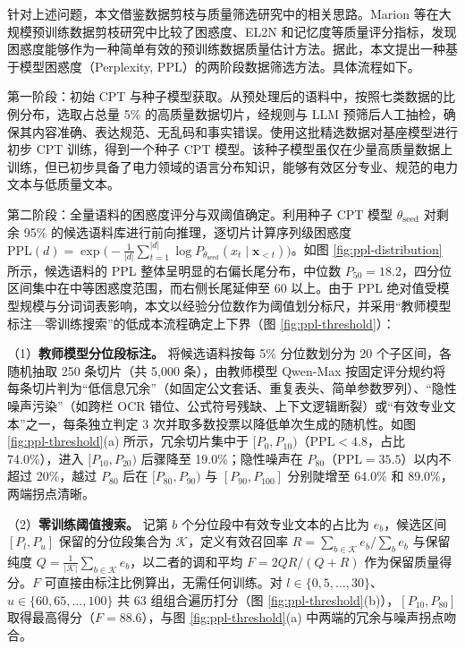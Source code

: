 \documentclass[fontset=fandol,type=master,campus=shenzhen,etitleauto=true]{hithesisbook}
\begin{document}
针对上述问题，本文借鉴数据剪枝与质量筛选研究中的相关思路。Marion 等在大规模预训练数据剪枝研究中比较了困惑度、EL2N 和记忆度等质量评分指标，发现困惑度能够作为一种简单有效的预训练数据质量估计方法\cite{ref58}。据此，本文提出一种基于模型困惑度（Perplexity, PPL）的两阶段数据筛选方法。具体流程如下。

第一阶段：初始 CPT 与种子模型获取。从预处理后的语料中，按照七类数据的比例分布，选取占总量 5\% 的高质量数据切片，经规则与 LLM 预筛后人工抽检，确保其内容准确、表达规范、无乱码和事实错误。使用这批精选数据对基座模型进行初步 CPT 训练，得到一个种子 CPT 模型。该种子模型虽仅在少量高质量数据上训练，但已初步具备了电力领域的语言分布知识，能够有效区分专业、规范的电力文本与低质量文本。

第二阶段：全量语料的困惑度评分与双阈值确定。利用种子 CPT 模型 $\theta_{\text{seed}}$ 对剩余 95\% 的候选语料库进行前向推理，逐切片计算序列级困惑度 $\text{PPL}(d) = \exp\bigl(-\frac{1}{|d|}\sum_{t=1}^{|d|} \log P_{\theta_{\text{seed}}}(x_t \mid \mathbf{x}_{<t})\bigr)$。如图 \ref{fig:ppl-distribution} 所示，候选语料的 PPL 整体呈明显的右偏长尾分布，中位数 $P_{50} = 18.2$，四分位区间集中在中等困惑度范围，而右侧长尾延伸至 $60$ 以上。由于 PPL 绝对值受模型规模与分词词表影响，本文以经验分位数作为阈值划分标尺，并采用“教师模型标注—零训练搜索”的低成本流程确定上下界（图 \ref{fig:ppl-threshold}）：

（1）\textbf{教师模型分位段标注。} 将候选语料按每 5\% 分位数划分为 20 个子区间，各随机抽取 250 条切片（共 5,000 条），由教师模型 Qwen-Max 按固定评分规约将每条切片判为“低信息冗余”（如固定公文套话、重复表头、简单参数罗列）、“隐性噪声污染”（如跨栏 OCR 错位、公式符号残缺、上下文逻辑断裂）或“有效专业文本”之一，每条独立判定 3 次并取多数投票以降低单次生成的随机性。如图 \ref{fig:ppl-threshold}(a) 所示，冗余切片集中于 $[P_0, P_{10})$（$\text{PPL} < 4.8$，占比 74.0\%），进入 $[P_{10}, P_{20})$ 后骤降至 19.0\%；隐性噪声在 $P_{80}$（$\text{PPL} = 35.5$）以内不超过 20\%，越过 $P_{80}$ 后在 $[P_{80}, P_{90})$ 与 $[P_{90}, P_{100}]$ 分别陡增至 64.0\% 和 89.0\%，两端拐点清晰。

（2）\textbf{零训练阈值搜索。} 记第 $b$ 个分位段中有效专业文本的占比为 $e_b$，候选区间 $[P_l, P_u]$ 保留的分位段集合为 $\mathcal{K}$，定义有效召回率 $R = \sum_{b \in \mathcal{K}} e_b / \sum_{b} e_b$ 与保留纯度 $Q = \frac{1}{|\mathcal{K}|}\sum_{b \in \mathcal{K}} e_b$，以二者的调和平均 $F = 2QR/(Q+R)$ 作为保留质量得分。$F$ 可直接由标注比例算出，无需任何训练。对 $l \in \{0, 5, \dots, 30\}$、$u \in \{60, 65, \dots, 100\}$ 共 63 组组合遍历打分（图 \ref{fig:ppl-threshold}(b)），$[P_{10}, P_{80}]$ 取得最高得分（$F = 88.6$），与图 \ref{fig:ppl-threshold}(a) 中两端的冗余与噪声拐点吻合。
\end{document}
